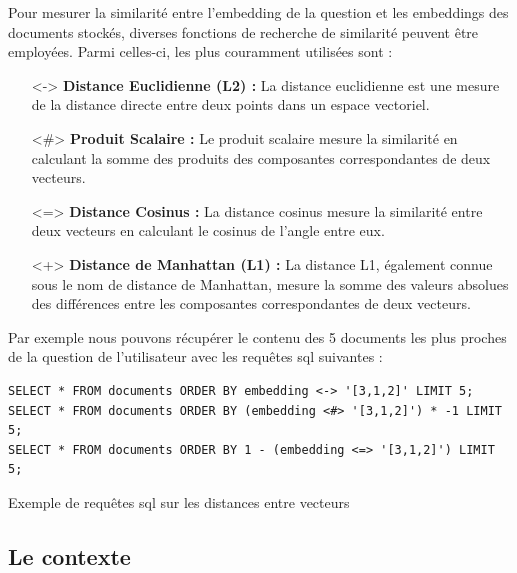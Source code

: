 Pour mesurer la similarité entre l'embedding de la question et les embeddings des documents stockés, diverses fonctions de recherche de similarité peuvent être employées. Parmi celles-ci, les plus couramment utilisées sont :

\begin{itemize}
    \item[<->] \textbf{Distance Euclidienne (L2)  : } 
    La distance euclidienne est une mesure de la distance directe entre deux points dans un espace vectoriel.
    
    \item[<\#>] \textbf{Produit Scalaire  :} 
    Le produit scalaire mesure la similarité en calculant la somme des produits des composantes correspondantes de deux vecteurs.
    
    \item[<=>] \textbf{Distance Cosinus :}
    La distance cosinus mesure la similarité entre deux vecteurs en calculant le cosinus de l'angle entre eux.
    
    \item[<+>] \textbf{Distance de Manhattan (L1) :}
    La distance L1, également connue sous le nom de distance de Manhattan, mesure la somme des valeurs absolues des différences entre les composantes correspondantes de deux vecteurs.
\end{itemize}

Par exemple nous pouvons récupérer le contenu des 5 documents les plus proches de la question de l'utilisateur avec les requêtes \ac{sql} suivantes : 

\hspace{1pt}
\begin{listing}[!ht]
\begin{verbatim}
SELECT * FROM documents ORDER BY embedding <-> '[3,1,2]' LIMIT 5;
SELECT * FROM documents ORDER BY (embedding <#> '[3,1,2]') * -1 LIMIT 5;
SELECT * FROM documents ORDER BY 1 - (embedding <=> '[3,1,2]') LIMIT 5;
\end{verbatim}
\caption{Exemple de requêtes \ac{sql} sur les distances entre vecteurs}
\label{appendix:code:sql:embeddings-distances}
\end{listing}

\subsection{Le contexte}

